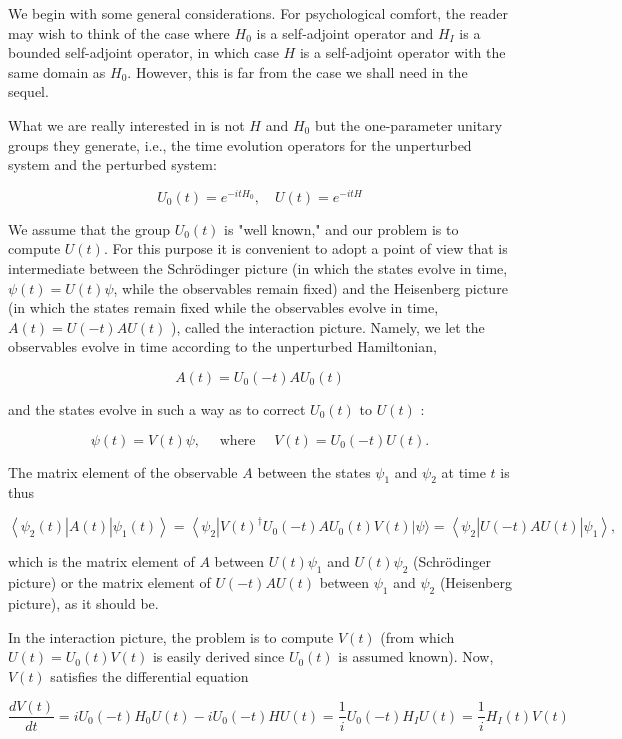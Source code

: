 \documentclass[10pt, letterpaper]{article}
\begin{document}
We begin with some general considerations. For psychological comfort, the reader may wish to think of the case where $H_{0}$ is a self-adjoint operator and $H_{I}$ is a bounded self-adjoint operator, in which case $H$ is a self-adjoint operator with the same domain as $H_{0}$. However, this is far from the case we shall need in the sequel.

What we are really interested in is not $H$ and $H_{0}$ but the one-parameter unitary groups they generate, i.e., the time evolution operators for the unperturbed system and the perturbed system:

$$
U_{0}(t)=e^{-i t H_{0}}, \quad U(t)=e^{-i t H}
$$

We assume that the group $U_{0}(t)$ is "well known," and our problem is to compute $U(t)$. For this purpose it is convenient to adopt a point of view that is intermediate between the Schrödinger picture (in which the states evolve in time, $\psi(t)=U(t) \psi$, while the observables remain fixed) and the Heisenberg picture (in which the states remain fixed while the observables evolve in time, $A(t)=U(-t) A U(t)$ ), called the interaction picture. Namely, we let the observables evolve in time according to the unperturbed Hamiltonian,

$$
A(t)=U_{0}(-t) A U_{0}(t)
$$

and the states evolve in such a way as to correct $U_{0}(t)$ to $U(t)$ :

$$
\psi(t)=V(t) \psi, \quad \text { where } \quad V(t)=U_{0}(-t) U(t) .
$$

The matrix element of the observable $A$ between the states $\psi_{1}$ and $\psi_{2}$ at time $t$ is thus

$$
\left\langle\psi_{2}(t)\right| A(t)\left|\psi_{1}(t)\right\rangle=\left\langle\psi_{2}\right| V(t)^{\dagger} U_{0}(-t) A U_{0}(t) V(t)|\psi\rangle=\left\langle\psi_{2}\right| U(-t) A U(t)\left|\psi_{1}\right\rangle,
$$

which is the matrix element of $A$ between $U(t) \psi_{1}$ and $U(t) \psi_{2}$ (Schrödinger picture) or the matrix element of $U(-t) A U(t)$ between $\psi_{1}$ and $\psi_{2}$ (Heisenberg picture), as it should be.

In the interaction picture, the problem is to compute $V(t)$ (from which $U(t)= U_{0}(t) V(t)$ is easily derived since $U_{0}(t)$ is assumed known). Now, $V(t)$ satisfies the differential equation

$$
\frac{d V(t)}{d t}=i U_{0}(-t) H_{0} U(t)-i U_{0}(-t) H U(t)=\frac{1}{i} U_{0}(-t) H_{I} U(t)=\frac{1}{i} H_{I}(t) V(t)
$$
\end{document}
